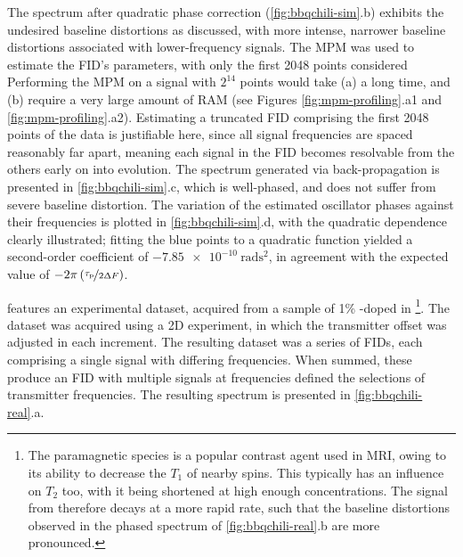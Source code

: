 The spectrum after quadratic phase correction (\cref{fig:bbqchili-sim}.b)
exhibits the undesired baseline distortions as discussed, with more intense,
narrower baseline distortions associated with lower-frequency signals.
The \ac{MPM} was used to estimate the \ac{FID}'s parameters,
with only the first 2048 points considered
Performing the \ac{MPM} on a signal with $2^{14}$ points would take (a) a
long time, and (b) require a very large amount of \ac{RAM} (see Figures
\ref{fig:mpm-profiling}.a1 and \ref{fig:mpm-profiling}.a2).
Estimating a truncated \ac{FID} comprising the first 2048 points of the
data is justifiable here, since all signal frequencies are spaced
reasonably far apart, meaning each signal in the \ac{FID} becomes
resolvable from the others early on into evolution.
The spectrum generated via back-propagation is presented in
\cref{fig:bbqchili-sim}.c, which is well-phased, and does not suffer from
severe baseline distortion. The variation of the estimated oscillator
phases against their frequencies is plotted in \cref{fig:bbqchili-sim}.d, with
the quadratic dependence clearly illustrated; fitting the blue points to a
quadratic function yielded a second-order coefficient of
$\qty{-7.85e-10}{\radian\second\squared}$, in agreement with the expected value
of $-2 \pi \left(\nicefrac{\tau_{\text{p}}}{2 \Updelta F}\right)$.

 features an experimental dataset, acquired
from a sample of 1\% -doped  in \footnote{
    The paramagnetic species  is a popular
    contrast agent used in \ac{MRI}, owing to its ability to decrease the $T_1$
    of nearby spins. This typically has an influence on $T_2$ too, with it
    being shortened at high enough concentrations.
    The signal from  therefore decays at a more rapid rate, such that
    the baseline distortions observed in the phased spectrum of
    \cref{fig:bbqchili-real}.b are more pronounced.
}.
The dataset was acquired using a \ac{2D} experiment, in which the transmitter
offset was adjusted in each increment. The resulting dataset was a series of
\acp{FID}, each comprising a single  signal with differing frequencies.
When summed, these produce an \ac{FID} with multiple signals at frequencies
defined the selections of transmitter frequencies. The resulting spectrum is
presented in \cref{fig:bbqchili-real}.a.


